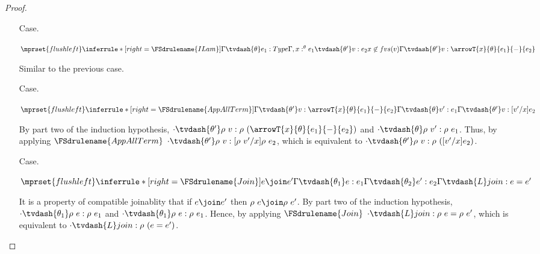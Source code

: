 \begin{proof}
\begin{itemize}
  \item[Case.]\ \\
    \begin{center}
      \begin{math}
        $$\mprset{flushleft}
        \inferrule* [right=\FSdrulename{ILam}] {
          \Gamma \tvdash{\theta} e_1:Type
          \\\\
          \Gamma,x:^{\theta} e_1 \tvdash{\theta'} v:e_2
          \\\\
          x \not \in fvs(v)
        }{\Gamma \tvdash{\theta'} 
          v:\arrowT{x}{\theta}{e_1}{-}{e_2}}
      \end{math}
    \end{center}
    Similar to the previous case.

  \item[Case.]\ \\
    \begin{center}
      \begin{math}
        $$\mprset{flushleft}
        \inferrule*[right=\FSdrulename{AppAllTerm}]{
          \Gamma \tvdash{\theta'} v:\arrowT{x}{\theta}{e_1}{-}{e_2}
          \\\\
          \Gamma \tvdash{\theta} v':e_1
        }{\Gamma \tvdash{\theta'} v:[v'/x]e_2}
      \end{math}
    \end{center}
    By part two of the induction hypothesis, 
    $\cdot \tvdash{\theta'} \rho\ v:\rho\ (\arrowT{x}{\theta}{e_1}{-}{e_2})$ and
    $\cdot \tvdash{\theta} \rho\ v':\rho\ e_1$.  Thus, by applying $\FSdrulename{AppAllTerm}$
    $\cdot \tvdash{\theta'} \rho\ v:[\rho\ v'/x]\rho\ e_2$, which is equivalent to
    $\cdot \tvdash{\theta'} \rho\ v:\rho\ ([v'/x]e_2)$.

  \item[Case.]\ \\
    \begin{center}
      \begin{math}
        $$\mprset{flushleft}
        \inferrule* [right=\FSdrulename{Join}] {
          e \join e'
          \\\\
          \Gamma \tvdash{\theta_1} e:e_1
          \\\\
          \Gamma \tvdash{\theta_2} e':e_2
        }{\Gamma \tvdash{L} join : e = e'}
      \end{math}
    \end{center}
    It is a property of compatible joinablity that if $e \join e'$ then
    $\rho\ e \join \rho\ e'$.  By part two of the induction hypothesis,
    $\cdot \tvdash{\theta_1} \rho\ e:\rho\ e_1$ and $\cdot \tvdash{\theta_1} \rho\ e:\rho\ e_1$.
    Hence, by applying $\FSdrulename{Join}$ $\cdot \tvdash{L} join : \rho\ e = \rho\ e'$, which 
    is equivalent to $\cdot \tvdash{L} join : \rho\ (e = e')$.


\end{itemize}
\end{proof}
